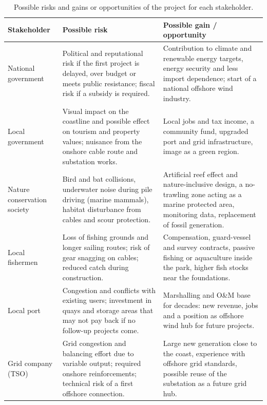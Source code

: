 \begin{table}[H]
    \centering
    \caption{Possible risks and gains or opportunities of the project for each stakeholder.}
    \label{tab:elec-stakeholders}
    \small
    \begin{tabular}{p{}p{}p{}}
        \hline
        Stakeholder & Possible risk & Possible gain / opportunity \\
        \hline
        National government & Political and reputational risk if the first project is delayed, over budget or meets public resistance; fiscal risk if a subsidy is required. & Contribution to climate and renewable energy targets, energy security and less import dependence; start of a national offshore wind industry. \\
        \hline
        Local government & Visual impact on the coastline and possible effect on tourism and property values; nuisance from the onshore cable route and substation works. & Local jobs and tax income, a community fund, upgraded port and grid infrastructure, image as a green region. \\
        \hline
        Nature conservation society & Bird and bat collisions, underwater noise during pile driving (marine mammals), habitat disturbance from cables and scour protection. & Artificial reef effect and nature-inclusive design, a no-trawling zone acting as a marine protected area, monitoring data, replacement of fossil generation. \\
        \hline
        Local fishermen & Loss of fishing grounds and longer sailing routes; risk of gear snagging on cables; reduced catch during construction. & Compensation, guard-vessel and survey contracts, passive fishing or aquaculture inside the park, higher fish stocks near the foundations. \\
        \hline
        Local port & Congestion and conflicts with existing users; investment in quays and storage areas that may not pay back if no follow-up projects come. & Marshalling and O\&M base for decades: new revenue, jobs and a position as offshore wind hub for future projects. \\
        \hline
        Grid company (TSO) & Grid congestion and balancing effort due to variable output; required onshore reinforcements; technical risk of a first offshore connection. & Large new generation close to the coast, experience with offshore grid standards, possible reuse of the substation as a future grid hub. \\
        \hline
    \end{tabular}
\end{table}

